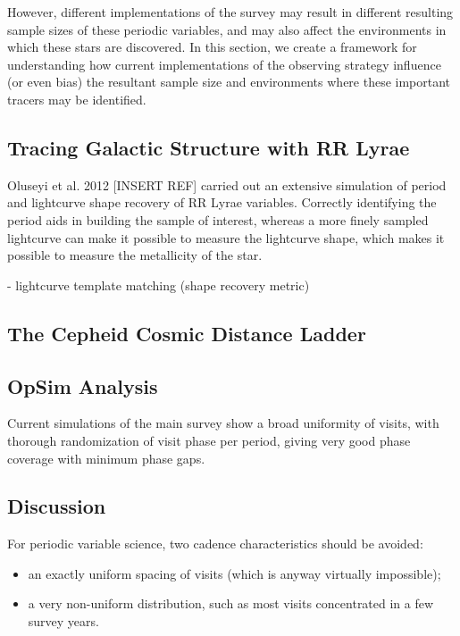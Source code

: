 However, different implementations of the survey may result in different resulting sample sizes of these periodic variables, and may also affect the environments in which these stars are discovered. In this section, we create a framework for understanding how current implementations of the observing strategy influence (or even bias) the resultant sample size and environments where these important tracers may be identified. 

\subsection{Tracing Galactic Structure with RR Lyrae}

Oluseyi et al. 2012 [INSERT REF] carried out an extensive simulation of period and lightcurve shape recovery of RR Lyrae variables. Correctly identifying the period aids in building the sample of interest, whereas a more finely sampled lightcurve can make it possible to measure the lightcurve shape, which makes it possible to measure the metallicity of the star.

- lightcurve template matching (shape recovery metric) 


\subsection{The Cepheid Cosmic Distance Ladder}


\subsection{OpSim Analysis}
\label{sec:keyword:analysis}

Current simulations of the main survey show a broad uniformity of visits, with thorough randomization of visit phase per period, giving very good phase coverage with minimum phase gaps.



\subsection{Discussion}
\label{sec:keyword:discussion}

For periodic variable science, two cadence characteristics should be avoided:
\begin{itemize}
\item an exactly uniform spacing of visits (which is anyway virtually impossible); \
\item a very non-uniform distribution, such as most visits concentrated in a few survey years.
 \end{itemize}

